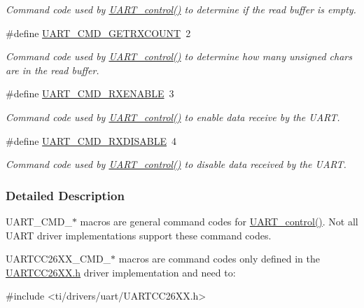 \begin{DoxyCompactItemize}
\begin{DoxyCompactList}\small\item\em Command code used by \hyperlink{_u_a_r_t_8h_a9de3c26cfe4ce6b7f350a6ea6e16801d}{U\+A\+R\+T\+\_\+control()} to determine if the read buffer is empty. \end{DoxyCompactList}\item 
\#define \hyperlink{group___u_a_r_t___c_m_d_ga470321cbd9eccf137ffbe6553ae7f35f}{U\+A\+R\+T\+\_\+\+C\+M\+D\+\_\+\+G\+E\+T\+R\+X\+C\+O\+U\+N\+T}~2
\begin{DoxyCompactList}\small\item\em Command code used by \hyperlink{_u_a_r_t_8h_a9de3c26cfe4ce6b7f350a6ea6e16801d}{U\+A\+R\+T\+\_\+control()} to determine how many unsigned chars are in the read buffer. \end{DoxyCompactList}\item 
\#define \hyperlink{group___u_a_r_t___c_m_d_gad67d01fa376f25bb28141d819647e8d3}{U\+A\+R\+T\+\_\+\+C\+M\+D\+\_\+\+R\+X\+E\+N\+A\+B\+L\+E}~3
\begin{DoxyCompactList}\small\item\em Command code used by \hyperlink{_u_a_r_t_8h_a9de3c26cfe4ce6b7f350a6ea6e16801d}{U\+A\+R\+T\+\_\+control()} to enable data receive by the U\+A\+R\+T. \end{DoxyCompactList}\item 
\#define \hyperlink{group___u_a_r_t___c_m_d_gac0b19ce2fa9f43d3fe255bcdbd3cda7b}{U\+A\+R\+T\+\_\+\+C\+M\+D\+\_\+\+R\+X\+D\+I\+S\+A\+B\+L\+E}~4
\begin{DoxyCompactList}\small\item\em Command code used by \hyperlink{_u_a_r_t_8h_a9de3c26cfe4ce6b7f350a6ea6e16801d}{U\+A\+R\+T\+\_\+control()} to disable data received by the U\+A\+R\+T. \end{DoxyCompactList}\end{DoxyCompactItemize}


\subsubsection{Detailed Description}
U\+A\+R\+T\+\_\+\+C\+M\+D\+\_\+$\ast$ macros are general command codes for \hyperlink{_u_a_r_t_8h_a9de3c26cfe4ce6b7f350a6ea6e16801d}{U\+A\+R\+T\+\_\+control()}. Not all U\+A\+R\+T driver implementations support these command codes.

U\+A\+R\+T\+C\+C26\+X\+X\+\_\+\+C\+M\+D\+\_\+$\ast$ macros are command codes only defined in the \hyperlink{_u_a_r_t_c_c26_x_x_8h}{U\+A\+R\+T\+C\+C26\+X\+X.\+h} driver implementation and need to\+: 
\begin{DoxyCode}
\textcolor{preprocessor}{#include <ti/drivers/uart/UARTCC26XX.h>}
\end{DoxyCode}
 

